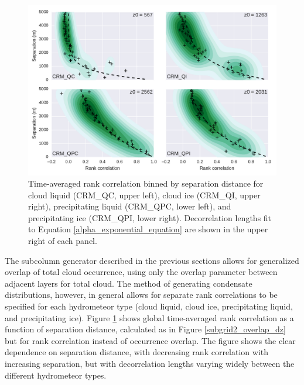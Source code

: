 \begin{figure}
\centering
\includegraphics[width=\columnwidth]{graphics/subgrid2_rankcorr_dz.pdf}
\caption{Time-averaged rank correlation binned by separation distance for cloud liquid (CRM\_QC, upper left), cloud ice (CRM\_QI, upper right), precipitating liquid (CRM\_QPC, lower left), and precipitating ice (CRM\_QPI, lower right). Decorrelation lengths fit to Equation \ref{alpha_exponential_equation} are shown in the upper right of each panel.}
\label{subgrid2_rankcorr_dz}
\end{figure}

The subcolumn generator described in the previous sections allows for generalized overlap of total cloud occurrence, using only the overlap parameter between adjacent layers for total cloud. The method of generating condensate distributions, however, in general allows for separate rank correlations to be specified for each hydrometeor type (cloud liquid, cloud ice, precipitating liquid, and precipitating ice). Figure \ref{subgrid2_rankcorr_dz} shows global time-averaged rank correlation as a function of separation distance, calculated as in Figure \ref{subgrid2_overlap_dz} but for rank correlation instead of occurrence overlap. The figure shows the clear dependence on separation distance, with decreasing rank correlation with increasing separation, but with decorrelation lengths varying widely between the different hydrometeor types.

